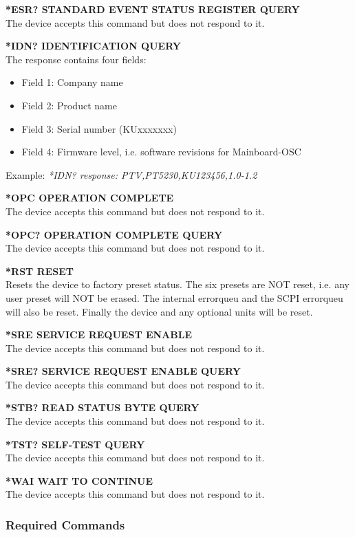 \textbf{*ESR? STANDARD EVENT STATUS REGISTER QUERY}\\
The device accepts this command but does not respond to it.

\textbf{*IDN? IDENTIFICATION QUERY}\\
The response contains four fields:
\begin{itemize}
\item Field 1: Company name
\item Field 2: Product name
\item Field 3: Serial number (KUxxxxxxx)
\item Field 4: Firmware level, i.e. software revisions for Mainboard-OSC
\end{itemize}

Example:
\textit{*IDN? response: PTV,PT5230,KU123456,1.0-1.2}

\textbf{*OPC OPERATION COMPLETE}\\
The device accepts this command but does not respond to it.

\textbf{*OPC? OPERATION COMPLETE QUERY}\\
The device accepts this command but does not respond to it.

\textbf{*RST RESET}\\
Resets the device to factory preset status. The six presets are NOT reset, i.e. any user preset will NOT be erased. The internal errorqueu and the SCPI errorqueu will also be reset. Finally the device and any optional units will be reset.

\textbf{*SRE SERVICE REQUEST ENABLE}\\
The device accepts this command but does not respond to it.

\textbf{*SRE? SERVICE REQUEST ENABLE QUERY}\\
The device accepts this command but does not respond to it.

\textbf{*STB? READ STATUS BYTE QUERY}\\
The device accepts this command but does not respond to it.

\textbf{*TST? SELF-TEST QUERY}\\
The device accepts this command but does not respond to it.

\textbf{*WAI WAIT TO CONTINUE}\\
The device accepts this command but does not respond to it.

\subsubsection{Required Commands}

